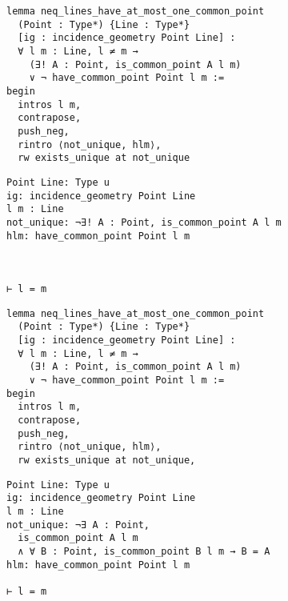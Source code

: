 \begin{frame}[fragile]
	\begin{multicols}{2}
		\begin{lstlisting}
lemma neq_lines_have_at_most_one_common_point 
  (Point : Type*) {Line : Type*} 
  [ig : incidence_geometry Point Line] :
  ∀ l m : Line, l ≠ m → 
    (∃! A : Point, is_common_point A l m) 
    ∨ ¬ have_common_point Point l m := 
begin
  intros l m,
  contrapose,
  push_neg,
  rintro ⟨not_unique, hlm⟩,
  rw exists_unique at not_unique
\end{lstlisting}
		\columnbreak
		\begin{lstlisting}
Point Line: Type u
ig: incidence_geometry Point Line
l m : Line
not_unique: ¬∃! A : Point, is_common_point A l m
hlm: have_common_point Point l m



⊢ l = m
		\end{lstlisting}
	\end{multicols}
\end{frame}










\begin{frame}[fragile]
	\begin{multicols}{2}
		\begin{lstlisting}
lemma neq_lines_have_at_most_one_common_point 
  (Point : Type*) {Line : Type*} 
  [ig : incidence_geometry Point Line] :
  ∀ l m : Line, l ≠ m → 
    (∃! A : Point, is_common_point A l m) 
    ∨ ¬ have_common_point Point l m := 
begin
  intros l m,
  contrapose,
  push_neg,
  rintro ⟨not_unique, hlm⟩,
  rw exists_unique at not_unique,
\end{lstlisting}
		\columnbreak
		\begin{lstlisting}
Point Line: Type u
ig: incidence_geometry Point Line
l m : Line
not_unique: ¬∃ A : Point, 
  is_common_point A l m 
  ∧ ∀ B : Point, is_common_point B l m → B = A
hlm: have_common_point Point l m

⊢ l = m
		\end{lstlisting}
	\end{multicols}
\end{frame}










